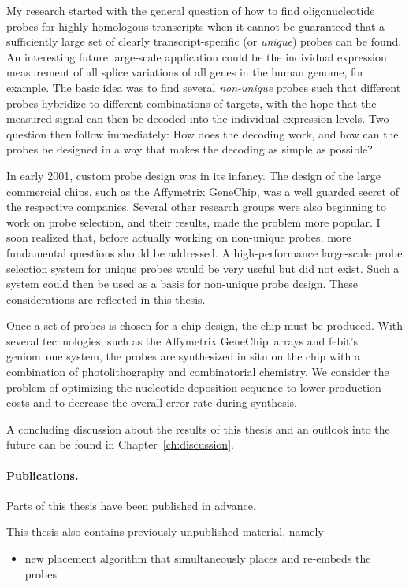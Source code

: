 My research started with the general question of how to find
oligonucleotide probes for highly homologous transcripts when it
cannot be guaranteed that a sufficiently large set of clearly
transcript-specific (or \emph{unique}) probes can be found. An
interesting future large-scale application could be the individual
expression measurement of all splice variations of all genes in the
human genome, for example. The basic idea was to find several
\emph{non-unique} probes such that different probes hybridize to
different combinations of targets, with the hope that the measured
signal can then be decoded into the individual expression levels. Two
question then follow immediately: How does the decoding work, and how
can the probes be designed in a way that makes the decoding as simple
as possible?

In early 2001, custom probe design was in its infancy. The design of
the large commercial chips, such as the Affymetrix GeneChip\textR, was
a well guarded secret of the respective companies. Several other
research groups were also beginning to work on probe selection, and
their results, made the
problem more popular.  I soon realized that, before actually working
on non-unique probes, more fundamental questions should be addressed.
A high-performance large-scale probe selection system for unique
probes would be very useful but did not exist. Such a system could
then be used as a basis for non-unique probe design. These
considerations are reflected in this thesis.

Once a set of probes is chosen for a chip design, the chip must be
produced. With several technologies, such as the Affymetrix
GeneChip\textR\ arrays and febit's {\sffamily geniom}\textR\ 
{\sffamily one} system, the probes are synthesized in situ on the chip
with a combination of photolithography and combinatorial chemistry.
We consider the problem of optimizing the nucleotide deposition
sequence to lower production costs and to decrease the overall error
rate during synthesis.

A concluding discussion about the results of this thesis and an
outlook into the future can be found in Chapter~\ref{ch:discussion}.

\paragraph{Publications.}
Parts of this thesis have been published in advance.

This thesis also contains previously unpublished material, namely
\begin{itemize}
\item new placement algorithm that simultaneously places and re-embeds
  the probes
\end{itemize}

